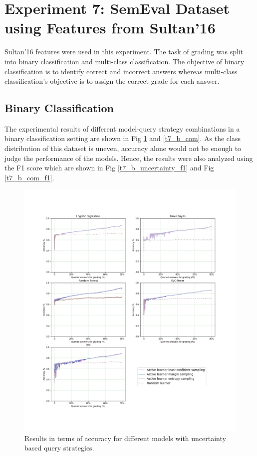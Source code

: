 \section{Experiment 7: SemEval Dataset using Features from Sultan'16}

Sultan'16 features were used in this experiment. The task of grading was split into binary classification and multi-class classification. The objective of binary classification is to identify correct and incorrect answers whereas multi-class classification's objective is to assign the correct grade for each answer. 

\subsection{Binary Classification}

The experimental results of different model-query strategy combinations in a binary classification setting are shown in Fig \ref{t7_b_uncertainty} and \ref{t7_b_com}. As the class distribution of this dataset is uneven, accuracy alone would not be enough to judge the performance of the models. Hence, the results were also analyzed using the F1 score which are shown in Fig \ref{t7_b_uncertainty_f1} and Fig \ref{t7_b_com_f1}.

\begin{figure}[!htb]
	\centering
	\includegraphics[scale=0.46]{images/binary/task7_accuracy_uncertainty}
	\caption{Results in terms of accuracy for different models with uncertainty based query strategies.}
	\label{t7_b_uncertainty}
\end{figure}

